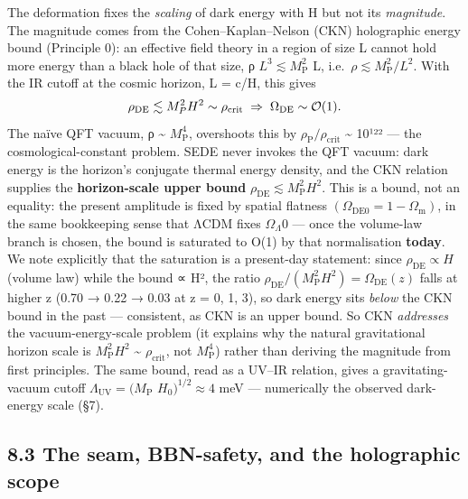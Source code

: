 \documentclass[
  10pt,
]{article}
\begin{document}
The deformation fixes the \emph{scaling} of dark energy with H but not
its \emph{magnitude}. The magnitude comes from the Cohen--Kaplan--Nelson
(CKN) holographic energy bound (Principle 0): an effective field theory
in a region of size L cannot hold more energy than a black hole of that
size, ρ \(L^{3} \lesssim  M_{\mathrm{P}}^{2}\) L,
i.e.~\(\rho  \lesssim  M_{\mathrm{P}}^{2}/L^{2}\). With the IR cutoff at
the cosmic horizon, L = c/H, this gives
\[\rho_{\rm DE} \lesssim M_P^2 H^2 \sim \rho_{\rm crit} \;\Rightarrow\; \Omega_{\rm DE} \sim \mathcal{O}(1).\]
The naïve QFT vacuum, ρ \textasciitilde{} \(M_{\mathrm{P}}^{4}\),
overshoots this by \(\rho _{\mathrm{P}}/\rho _{\mathrm{crit}}\)
\textasciitilde{} 10¹²² --- the cosmological-constant problem. SEDE
never invokes the QFT vacuum: dark energy is the horizon's conjugate
thermal energy density, and the CKN relation supplies the
\textbf{horizon-scale upper bound}
\(\rho _{\mathrm{DE}} \lesssim  M_{\mathrm{P}}^{2}H^{2}\). This is a
bound, not an equality: the present amplitude is fixed by spatial
flatness \((\Omega _{\mathrm{DE0}} = 1 - \Omega _{\mathrm{m}})\), in the
same bookkeeping sense that ΛCDM fixes \(\Omega _\Lambda 0\) --- once
the volume-law branch is chosen, the bound is saturated to O(1) by that
normalisation \textbf{today}. We note explicitly that the saturation is
a present-day statement: since \(\rho _{\mathrm{DE}} \propto  H\)
(volume law) while the bound ∝ H², the ratio
\(\rho _{\mathrm{DE}}/(M_{\mathrm{P}}^{2}H^{2}) = \Omega _{\mathrm{DE}}(z)\)
falls at higher z (0.70 → 0.22 → 0.03 at z = 0, 1, 3), so dark energy
sits \emph{below} the CKN bound in the past --- consistent, as CKN is an
upper bound. So CKN \emph{addresses} the vacuum-energy-scale problem (it
explains why the natural gravitational horizon scale is
\(M_{\mathrm{P}}^{2}H^{2}\) \textasciitilde{} \(\rho _{\mathrm{crit}}\),
not \(M_{\mathrm{P}}^{4}\)) rather than deriving the magnitude from
first principles. The same bound, read as a UV--IR relation, gives a
gravitating-vacuum cutoff \(\Lambda _{\mathrm{UV}} = (M_{\mathrm{P}}\)
\(H_{0})^{1/2} \approx  4\) meV --- numerically the observed dark-energy
scale (§7).

\subsection{8.3 The seam, BBN-safety, and the holographic
scope}\label{the-seam-bbn-safety-and-the-holographic-scope}
\end{document}
